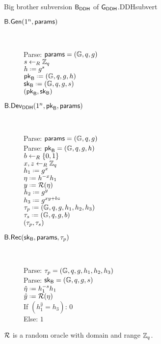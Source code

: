 \begin{boxfigGame}{Big brother subversion $\mathsf{B}_{\mathsf{DDH}}$ of $\operatorname{\mathsf{G}}_{\mathsf{DDH}}$.}{DDHsubvert}
  \begin{description}
 	\item[\underline{$\mathsf{B}.\mathsf{Gen}(1^n,\mathsf{params})$}] ~
 	
 		Parse: $\mathsf{params} = (\mathbb{G},q,g)$ \\
 		$s\leftarrow_R\mathbb{Z}_q$ \\
 		$h \defeq g^s$ \\
 		$\bbpk \defeq (\cgroup,\order,\generator,h)$ \\
 		 $\bbsk \defeq (\cgroup,\order,\generator,s)$ \\
 		\Ret $(\mathsf{pk}_{\mathsf{B}},\mathsf{sk}_{\mathsf{B}})$

	\item[\underline{$\mathsf{B}.\mathsf{Dev}_{\mathsf{DDH}}(1^n,\mathsf{pk}_{\mathsf{B}},\mathsf{params})$}] ~
		
		Parse: $\mathsf{params} = (\mathbb{G},q,g)$ \\
		Parse: $\mathsf{pk}_{\mathsf{B}} = (\mathbb{G},q,g,h)$ \\
		$b\leftarrow_R\left\{0,1\right\}$ \\
		$x,z\leftarrow_R\mathbb{Z}_q$ \\
		$h_1 \defeq g^x$ \\
		$\eta \defeq h^{-x}h_1$ \\
		$y\defeq \RO(\eta)$ \\
		$h_2 \defeq g^y$ \\
		$h_3 \defeq g^{xy+bz}$ \\ 		
 		$\ptrans \defeq (\cgroup,\order,\generator,h_1,h_2,h_3)$ \\
 		$\strans \defeq (\cgroup,\order,\generator,b)$\\
 		\Ret $(\tau_p,\tau_s)$
		
	\item[\underline{$\mathsf{B}.\mathsf{Rec}(\mathsf{sk}_{\mathsf{B}},\mathsf{params},\tau_p)$}] ~
	
		Parse: $\tau_p = (\mathbb{G},q,g,h_1,h_2,h_3)$\\
		Parse: $\mathsf{sk}_{\mathsf{B}} = (\mathbb{G},q,g,s)$\\
		$\hat{\eta}\defeq h_1^{-s}h_1$\\
		$\hat{y} \defeq \RO(\eta)$\\
		If $(h_1^{\hat{y}} = h_3)$: \Ret $0$\\
		Else: \Ret $1$
		
  \end{description}
  $\operatorname{\mathcal{R}}$ is a random oracle with domain and range $\mathbb{Z}_q$.
\end{boxfigGame}

